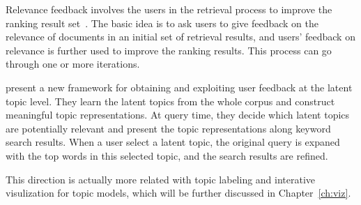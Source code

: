 Relevance feedback involves the users in the retrieval process to improve the ranking result set~\citep{Rocchio-1971}. The basic idea is to ask users to give feedback on the relevance of documents in an initial set of retrieval results, and users' feedback on relevance is further used to improve the ranking results. This process can go through one or more iterations.

\cite{Andrzejewski-2011} present a new framework for obtaining and
exploiting user feedback at the latent topic level. They learn the
latent topics from the whole corpus and construct meaningful topic
representations. At query time, they decide which latent topics are
potentially relevant and present the topic representations along
keyword search results. When a user select a latent topic, the
original query is expaned with the top words in this selected topic,
and the search results are refined.

This direction is actually more related with topic labeling and interative visulization for topic models, which will be further discussed in Chapter~\ref{ch:viz}.




